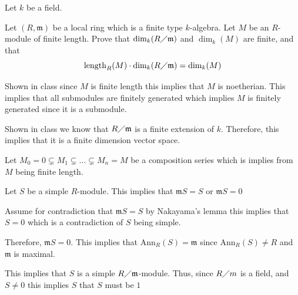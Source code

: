 \documentclass[12pt, letterpaper]{article}
\newcommand{\Ann}{\mathrm{Ann}}
\newcommand{\mf}[1]{\mathfrak{#1}}
\begin{document}
\begin{problem}{}
    Let $k$ be a field.
\end{problem}
\begin{subproblem}{}
    Let $(R, \mf{m})$ be a local ring which is a finite type $k$-algebra. Let $M$ be an $R$-module of finite length.
    Prove that $\dim_k(R \diagup \mf{m})$ and $\dim_k(M)$ are finite, and that
    \[\mathrm{length}_R(M) \cdot \dim_k(R \diagup \mf{m}) = \dim_k(M)\]
\end{subproblem}
\begin{problemproof}
    Shown in class since $M$ is finite length this implies that $M$ is noetherian. This implies that all submodules are finitely generated which implies $M$ is finitely generated since it is a submodule.

    Shown in class we know that $R \diagup \mf{m}$ is a finite extension of $k$. Therefore, this implies that it is a finite dimension vector space.

    Let $M_0=0 \subsetneq M_1 \subsetneq \dots \subsetneq M_n = M$ be a composition series which is implies from $M$ being finite length.

    Let $S$ be a simple $R$-module. 
    This implies that $\mf{m}S=S$ or $\mf{m}S=0$

    Assume for contradiction that $\mf{m}S=S$ by Nakayama's lemma this implies that $S=0$ which is a contradiction of $S$ being simple.

    Therefore, $\mf{m}S=0$. This implies that $\Ann_R(S) = \mf{m}$ since $\Ann_R(S) \neq R$ and $\mf{m}$ is maximal.

    This implies that $S$ is a simple $R \diagup \mf{m}$-module. Thus, since $R \diagup m$ is a field, and $S \neq 0$ this implies $S$ that $S$ must be $1$
\end{problemproof}
\end{document}

